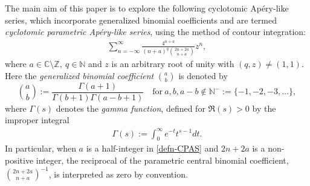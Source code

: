 \documentclass[11pt]{article}
\def\N{\mathbb{N}}
\def\Z{\mathbb{Z}}
\theoremstyle{plain}
\theoremstyle{definition}
\begin{document}
The main aim of this paper is to explore the following cyclotomic Ap\'ery-like series, which incorporate generalized binomial coefficients and are termed \emph{cyclotomic parametric Ap\'ery-like series}, using the method of contour integration:
\begin{align}\label{defn-CPAS}
\sum_{n=-\infty}^\infty \frac{4^{n+a}}{(n+a)^q\binom{2n+2a}{n+a}}z^n,
\end{align}
where $a\in \mathbb{C}\setminus \Z,\ q\in\N$ and $z$ is an arbitrary root of unity with $(q,z)\neq(1,1)$. Here the \emph{generalized binomial coefficient} $\binom{a}{b}$ is denoted by
\[\binom{a}{b}:=\frac{\Gamma(a+1)}{\Gamma(b+1)\Gamma(a-b+1)}
    \quad\text{for}\ a,b,a-b\notin \N^-:=\{-1,-2,-3,\ldots\},\]
where $\Gamma(s)$ denotes the \emph{gamma function}, defined for $\Re(s) > 0$ by the improper integral
\begin{align*}
\Gamma(s):=\int_0^\infty e^{-t}t^{s-1}dt.
\end{align*} In particular, when $a$ is a half-integer in \eqref{defn-CPAS} and $2n+2a$  is a non-positive integer, the reciprocal of the parametric central binomial coefficient, $\binom{2n+2a}{n+a}^{-1}$, is interpreted as zero by convention.
\end{document}
